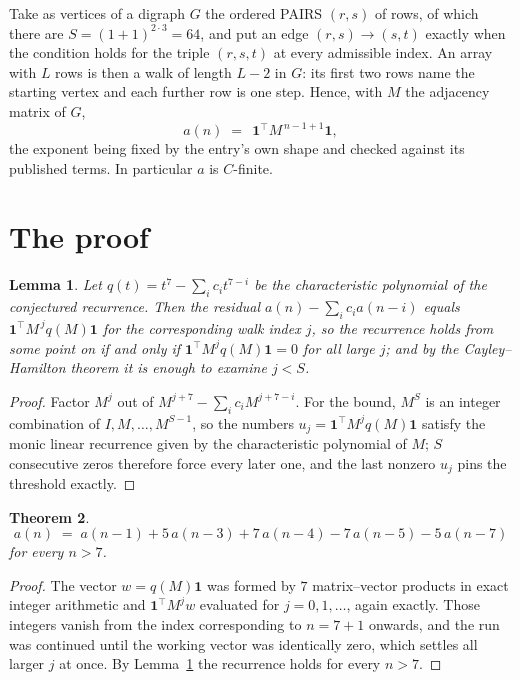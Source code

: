 \documentclass[11pt,a4paper]{article}
\theoremstyle{plain}
\newtheorem{theorem}{Theorem}
\newtheorem{lemma}[theorem]{Lemma}
\theoremstyle{definition}
\begin{document}
Take as vertices of a digraph $G$ the ordered PAIRS $(r,s)$ of rows, of which there are
$S=(1+1)^{2\cdot3}=64$, and put an edge $(r,s)\to(s,t)$ exactly when the condition
holds for the triple $(r,s,t)$ at every admissible index. An array with $L$ rows is then a
walk of length $L-2$ in $G$: its first two rows name the starting vertex and each further
row is one step. Hence, with $M$ the adjacency matrix of $G$,
\[
a(n)\;=\;\,\mathbf{1}^{\!\top}M^{\,n-1+1}\mathbf{1},
\]
the exponent being fixed by the entry's own shape and checked against its published terms.
In particular $a$ is $C$-finite.

\section{The proof}

\begin{lemma}\label{lem:crit}
Let $q(t)=t^{7}-\sum_i c_it^{7-i}$ be the characteristic polynomial of the
conjectured recurrence. Then the residual $a(n)-\sum_ic_ia(n-i)$ equals
$\mathbf{1}^{\!\top}M^{\,j}q(M)\mathbf{1}$ for the corresponding walk index
$j$, so the recurrence holds from some point on if and only if
$\mathbf{1}^{\!\top}M^{j}q(M)\mathbf{1}=0$ for all large $j$; and by the
Cayley--Hamilton theorem it is enough to examine $j<S$.
\end{lemma}

\begin{proof}
Factor $M^{j}$ out of $M^{j+7}-\sum_ic_iM^{j+7-i}$. For the bound, $M^{S}$
is an integer combination of $I,M,\dots,M^{S-1}$, so the numbers
$u_j=\mathbf{1}^{\!\top}M^{j}q(M)\mathbf{1}$ satisfy the monic linear recurrence given by
the characteristic polynomial of $M$; $S$ consecutive zeros therefore force every later one,
and the last nonzero $u_j$ pins the threshold exactly.
\end{proof}

\begin{theorem}
\[
a(n)\;=\;a(n-1) + 5\,a(n-3) + 7\,a(n-4) - 7\,a(n-5) - 5\,a(n-7)
\]
for every $n>7$.
\end{theorem}

\begin{proof}
The vector $w=q(M)\mathbf{1}$ was formed by $7$ matrix--vector products in exact
integer arithmetic and $\mathbf{1}^{\!\top}M^{j}w$ evaluated for $j=0,1,\dots$, again
exactly. Those integers vanish from the index corresponding to $n=7+1$ onwards, and the
run was continued until the working vector was identically zero, which settles all larger $j$
at once. By Lemma~\ref{lem:crit} the recurrence holds for every $n>7$.
\end{proof}
\end{document}
